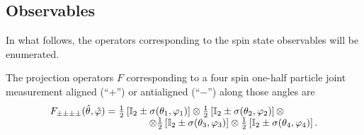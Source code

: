 \documentclass[pra,amsfonts,showpacs,showkeys,preprint]{revtex4}
\begin{document}
\subsection{Observables}

In what follows, the operators corresponding to the spin state observables will be enumerated.



The projection operators $F$
corresponding to a four spin one-half particle joint measurement
aligned (``$+$'') or antialigned  (``$-$'') along those angles are
\begin{equation}
\begin{array}{lll}
 F_{\pm \pm \pm \pm} ({\hat \theta},{\hat \varphi} ) =
{\frac{1}{2}}\left[{\mathbb I}_2 \pm {\bf \sigma}( \theta_1,\varphi_1 )\right]
\otimes
{\frac{1}{2}}\left[{\mathbb I}_2 \pm {\bf \sigma}( \theta_2,\varphi_2 )\right] \otimes
\nonumber\\
\qquad\qquad\qquad\qquad\qquad
\otimes
{\frac{1}{2}}\left[{\mathbb I}_2 \pm {\bf \sigma}( \theta_3,\varphi_3 )\right]
\otimes
{\frac{1}{2}}\left[{\mathbb I}_2 \pm {\bf \sigma}( \theta_4,\varphi_4 )\right].
\end{array}
\label{2004-gtq-e2}
\end{equation}
\end{document}
